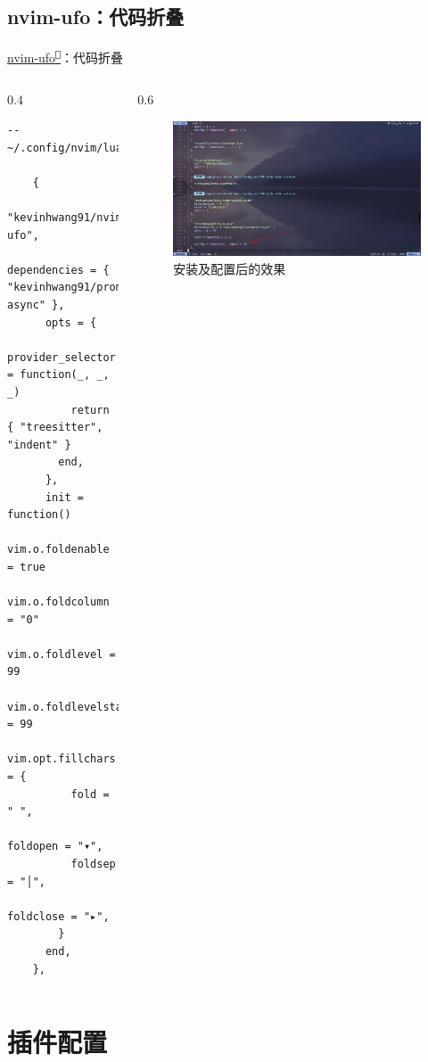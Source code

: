 \documentclass[aspectratio=169]{ctexbeamer}
\newcommand{\nerd}[1]{\texttt{#1}}
\newcommand{\link}[3][]{\href{#3}{#2\textsuperscript{\nerd{}}}}
\begin{document}
\subsection{nvim-ufo：代码折叠}
\begin{frame}[fragile]{\link{nvim-ufo}{https://github.com/kevinhwang91/nvim-ufo}：代码折叠}
  \begin{columns}
    \begin{column}{0.4\linewidth}
        \begin{lstlisting}[basicstyle=\tiny\ttfamily]
    -- ~/.config/nvim/lua/plugins/ui.lua

    {
      "kevinhwang91/nvim-ufo",
      dependencies = { "kevinhwang91/promise-async" },
      opts = {
        provider_selector = function(_, _, _)
          return { "treesitter", "indent" }
        end,
      },
      init = function()
        vim.o.foldenable = true
        vim.o.foldcolumn = "0"
        vim.o.foldlevel = 99
        vim.o.foldlevelstart = 99
        vim.opt.fillchars = {
          fold = " ",
          foldopen = "▾",
          foldsep = "│",
          foldclose = "▸",
        }
      end,
    },
        \end{lstlisting}
    \end{column}

    \begin{column}{0.6\linewidth}
      \begin{figure}[H]
        \centering
        \includegraphics[width=\linewidth]{./Figures/Ufo_Finish.jpg}
        \caption{安装及配置后的效果}%
      \end{figure}
    \end{column}
  \end{columns}
\end{frame}

\section{插件配置}
\end{document}
